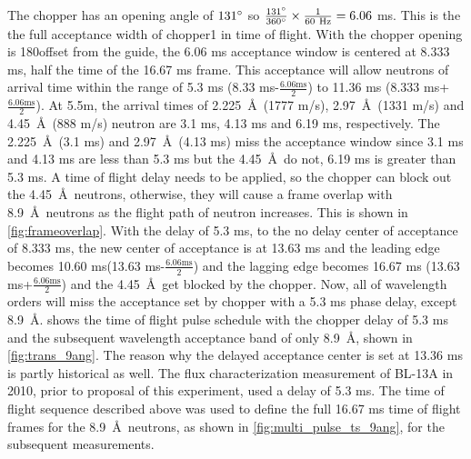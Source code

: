 The chopper has an opening angle of $131\degree$ so $ \frac{131\degree}{360\degree} \times \frac{1}{60~\text{Hz}} = 6.06$ ms. This is the the full acceptance width of chopper1 in time of flight. With the chopper opening is 180\degree offset from the guide, the 6.06 ms acceptance window is centered at 8.333 ms, half the time of the 16.67 ms frame. This acceptance will allow neutrons of arrival time within the range of 5.3 ms (8.33 ms-$\frac{6.06 \text{ms}}{2}$) to 11.36 ms (8.333 ms+$\frac{6.06\text{ms}}{2}$). At 5.5m, the arrival times of 2.225~\AA\ (1777 m/s), 2.97~\AA\ (1331 m/s) and 4.45~\AA\ (888 m/s) neutron are 3.1 ms, 4.13 ms and 6.19 ms, respectively. The 2.225~\AA\ (3.1 ms) and 2.97~\AA\ (4.13 ms) miss the acceptance window since 3.1 ms and 4.13 ms are less than 5.3 ms but the 4.45~\AA\ do not, 6.19 ms is greater than 5.3 ms. A time of flight delay needs to be applied, so the chopper can block out the 4.45~\AA\ neutrons, otherwise, they will cause a frame overlap with 8.9~\AA\ neutrons as the flight path of neutron increases. This is shown in \cref{fig:frameoverlap}. With the delay of 5.3 ms, to the no delay center of acceptance of 8.333 ms, the new center of acceptance is at 13.63 ms and the leading edge becomes 10.60 ms(13.63 ms-$\frac{6.06\text{ms}}{2}$) and the lagging edge becomes 16.67 ms (13.63 ms+$\frac{6.06\text{ms}}{2}$) and the 4.45~\AA\ get blocked by the chopper. Now, all of wavelength orders will miss the acceptance set by chopper with a 5.3 ms phase delay, except 8.9~\AA.  shows the time of flight pulse schedule with the chopper delay of 5.3 ms and the subsequent wavelength acceptance band of only 8.9~\AA, shown in \cref{fig:trans_9ang}. The reason why the delayed acceptance center is set at 13.36 ms is partly historical as well. The flux characterization measurement of BL-13A in 2010, prior to proposal of this experiment, used a delay of 5.3 ms. The time of flight sequence described above was used to define the full 16.67 ms time of flight frames for the 8.9~\AA\ neutrons, as shown in \cref{fig:multi_pulse_ts_9ang}, for the subsequent measurements.  


